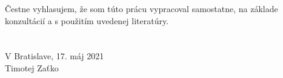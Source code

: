 \thispagestyle{empty}
\mbox{}\vfill
\noindent Čestne vyhlasujem, že som túto prácu vypracoval samostatne, na základe konzultácií a s použitím uvedenej literatúry.
\\
\\
\\

\noindent V Bratislave, 17. máj 2021\\

\hfill Timotej Zaťko \hspace{6mm}

\newpage\null\thispagestyle{empty}\newpage

